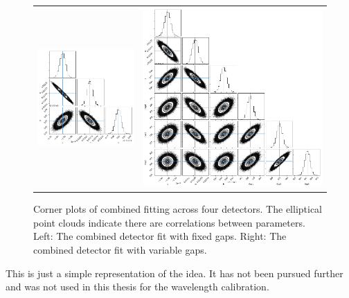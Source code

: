 \begin{figure}
    \centering
    \begin{tabular}{c c}
    \includegraphics[width=0.4\linewidth]{figures/appendix/fixed_quad_corner} & \includegraphics[width=0.45\linewidth]{figures/appendix/variable_quad_corner} \\
    \end{tabular}
    \caption[Multi-detector calibration parameter correlations.]{Corner plots of combined fitting across four detectors.
    The elliptical point clouds indicate there are correlations between parameters.
    Left: The combined detector fit with fixed gaps.
    Right: The combined detector fit with variable gaps.}
    \label{fig:quadcornerplots}
\end{figure}

This is just a simple representation of the idea.
It has not been pursued further and was not used in this thesis for the wavelength calibration.
